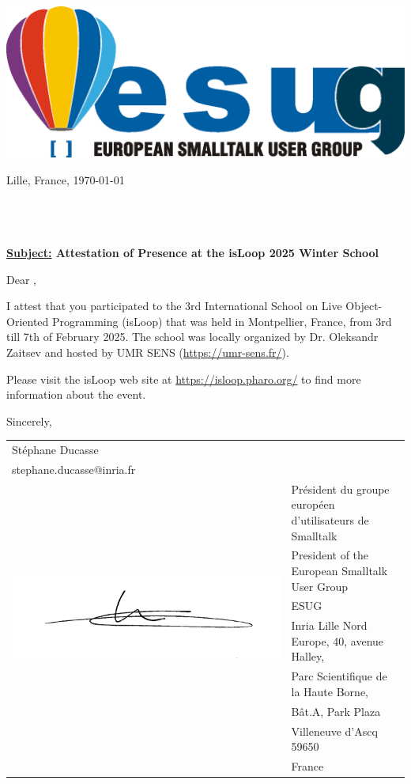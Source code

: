 \documentclass[parskip=full*,fontsize=10pt,BCOR=0pt,DIV=15]{scrreprt}
\begin{document}
\begin{center}
  \includegraphics[width=.4\textwidth]{esug-logo}
\end{center}

\begin{flushright}
  Lille, France, \today
\end{flushright}

\fullname\\
\\
\\

\textbf{\underline{Subject:}  Attestation of Presence at the isLoop 2025 Winter School}

Dear \fullname{},

I attest that you participated to the 3rd International School on Live Object-Oriented Programming (isLoop) that was held in Montpellier, France, from 3rd till 7th of February 2025. The school was locally organized by Dr. Oleksandr Zaitsev and hosted by UMR SENS (\url{https://umr-sens.fr/}).

Please visit the isLoop web site at \url{https://isloop.pharo.org/} to find more information about the event.

Sincerely,


\begin{tabular}{ll}
  St\'ephane Ducasse & \\
  stephane.ducasse@inria.fr&\\
  \multirow{7}{.5\textwidth}{\includegraphics[width=.5\textwidth]{signature}} & Pr\'esident du groupe europ\'een d'utilisateurs de Smalltalk \\
& President of  the European Smalltalk User Group\\
&  ESUG \\
&  Inria Lille Nord Europe, 40, avenue Halley,\\
&  Parc Scientifique de la Haute Borne,\\
&   Bât.A, Park Plaza\\
&  Villeneuve d'Ascq  59650\\
&  France
\end{tabular}
\end{document}
